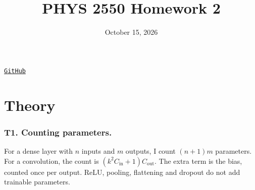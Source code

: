 \documentclass[11pt]{article}
\title{\vspace{-1.6em}\textbf{PHYS 2550 Homework 2}}
\author{\studentname}
\date{October 15, 2026}
\newcommand{\notebookurl}{https://github.com/beusy/applied-machine-learning-in-physics/tree/main/Homework\%202}
\begin{document}
\maketitle
\vspace{-1.7em}
\begin{center}
\href{\notebookurl}{\texttt{GitHub}}
\end{center}
\section{Theory}

\subsubsection*{T1. Counting parameters.}

For a dense layer with $n$ inputs and $m$ outputs, I count $(n+1)m$ parameters. For a convolution, the count is $(k^2C_{\mathrm{in}}+1)C_{\mathrm{out}}$. The extra term is the bias, counted once per output. ReLU, pooling, flattening and dropout do not add trainable parameters.
\end{document}
